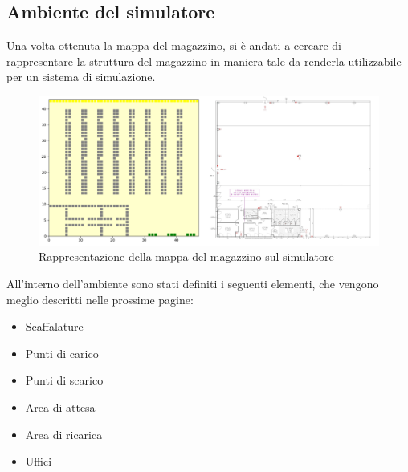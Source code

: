 \documentclass[12pt]{article}
\begin{document}
\subsection{Ambiente del simulatore}
Una volta ottenuta la mappa del magazzino, si è andati a cercare di rappresentare la struttura del magazzino in maniera tale da renderla utilizzabile per un sistema di simulazione.
\begin{figure}[ht]
\includegraphics[width=\linewidth]{Figures/Graphics/Simulation_Domain.PNG}
\caption{Rappresentazione della mappa del magazzino sul simulatore}\label{fig:Rappresentazione_mappa}
\end{figure}

\noindent All'interno dell'ambiente sono stati definiti i seguenti elementi, che vengono meglio descritti nelle prossime pagine:

\begin{itemize}
\item Scaffalature
\item Punti di carico
\item Punti di scarico
\item Area di attesa
\item Area di ricarica
\item Uffici
\end{itemize}
\newpage
\end{document}
